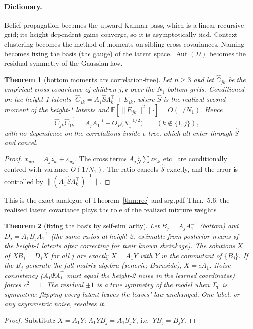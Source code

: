 \documentclass[11pt]{article}
\newtheorem{theorem}{Theorem}
\theoremstyle{definition}
\newcommand{\E}{\mathbb{E}}
\newcommand{\Aut}{\operatorname{Aut}}
\newcommand{\norm}[1]{\lVert #1\rVert}
\begin{document}
\paragraph{Dictionary.} Belief propagation becomes the upward Kalman pass, which is a linear
recursive grid; its height-dependent gains converge, so it is asymptotically tied. Context
clustering becomes the method of moments on sibling cross-covariances. Naming becomes fixing the
basis (the gauge) of the latent space. $\Aut(D)$ becomes the residual symmetry of the Gaussian law.

\begin{theorem}[bottom moments are correlation-free]\label{thm:cmom}
Let $n\ge3$ and let $\hat C_{jk}$ be the empirical cross-covariance of children $j,k$ over the
$N_1$ bottom grids. Conditioned on the height-1 latents,
$\hat C_{jk}=A_j\hat SA_k^\top+E_{jk}$, where $\hat S$ is the \emph{realized} second moment of the
height-1 latents and $\E[\norm{E_{jk}}^2\mid\cdot]=O(1/N_1)$. Hence
\[
\hat C_{jk}\hat C_{1k}^{-1}=A_jA_1^{-1}+O_P\big(N_1^{-1/2}\big)\qquad(k\notin\{1,j\}),
\]
with no dependence on the correlations inside a tree, which all enter through $\hat S$ and cancel.
\end{theorem}
\begin{proof}
$x_{wj}=A_jz_w+\varepsilon_{wj}$. The cross terms $A_j\frac1N\sum z\varepsilon_k^\top$ etc.\ are
conditionally centred with variance $O(1/N_1)$. The ratio cancels $\hat S$ exactly, and the
error is controlled by $\norm{(A_1\hat SA_k^\top)^{-1}}$.
\end{proof}
\noindent This is the exact analogue of Theorem~\ref{thm:rec} and srg.pdf Thm.~5.6: the realized
latent covariance plays the role of the realized mixture weights.

\begin{theorem}[fixing the basis by self-similarity]\label{thm:gauge}
Let $B_j=A_jA_1^{-1}$ (bottom) and $D_j=A_1B_jA_1^{-1}$ (the same ratios at height 2, estimable
from posterior means of the height-1 latents after correcting for their known shrinkage). The
solutions $X$ of $XB_j=D_jX$ for all $j$ are exactly $X=A_1Y$ with $Y$ in the commutant of
$\{B_j\}$. If the $B_j$ generate the full matrix algebra (generic; Burnside), $X=cA_1$. Noise
consistency ($A_1\Psi A_1^\top$ must equal the height-2 noise in the learned coordinates) forces
$c^2=1$. The residual $\pm1$ is a true symmetry of the model when $\Sigma_0$ is symmetric: flipping
every latent leaves the leaves' law unchanged. One label, or any asymmetric noise, resolves it.
\end{theorem}
\begin{proof}Substitute $X=A_1Y$: $A_1YB_j=A_1B_jY$, i.e.\ $YB_j=B_jY$.\end{proof}
\end{document}
